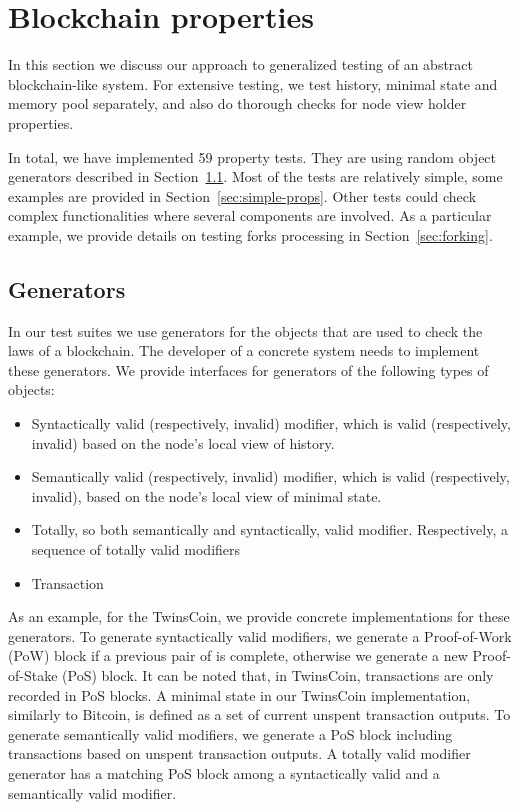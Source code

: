 
\section{Blockchain properties}
\label{sec:props}

In this section we discuss our approach to generalized testing of an abstract blockchain-like system. For extensive testing, we test history, minimal state and memory pool separately, and also do thorough checks for node view holder properties.
	
In total, we have implemented 59 property tests. They are using random object generators described in Section~\ref{sec:generators}. Most of the tests are relatively simple, some examples are provided in Section~\ref{sec:simple-props}. Other tests could check complex functionalities where several components are involved. As a particular example, we provide details on testing forks processing in Section~\ref{sec:forking}.

\subsection{Generators}
\label{sec:generators}

In our test suites we use generators for the objects that are used to check the laws of a blockchain. The developer of a concrete system needs to implement these generators. We provide interfaces for generators of the following types of objects:

\begin{itemize}
	\item{Syntactically valid (respectively, invalid) modifier, which is valid (respectively, invalid) based on the node's local view of history.}
	\item{Semantically valid (respectively, invalid) modifier, which is valid (respectively, invalid), based on the node's local view of minimal state.}
	\item{Totally, so both semantically and syntactically, valid modifier. Respectively, a sequence of totally valid modifiers}
	\item{Transaction}
\end{itemize}

As an example, for the TwinsCoin, we provide concrete implementations for these generators. To generate syntactically valid modifiers, we generate a Proof-of-Work (PoW) block if a previous pair of {\em<PoW block, PoS block>} is complete, otherwise we generate a new Proof-of-Stake (PoS) block. It can be noted that, in TwinsCoin, transactions are only recorded in PoS blocks. A minimal state in our TwinsCoin implementation, similarly to Bitcoin, is defined as a set of current unspent transaction outputs. To generate semantically valid modifiers, we generate a PoS block including transactions based on unspent transaction outputs. A totally valid modifier generator has a matching PoS block among a syntactically valid and a semantically valid modifier. %

